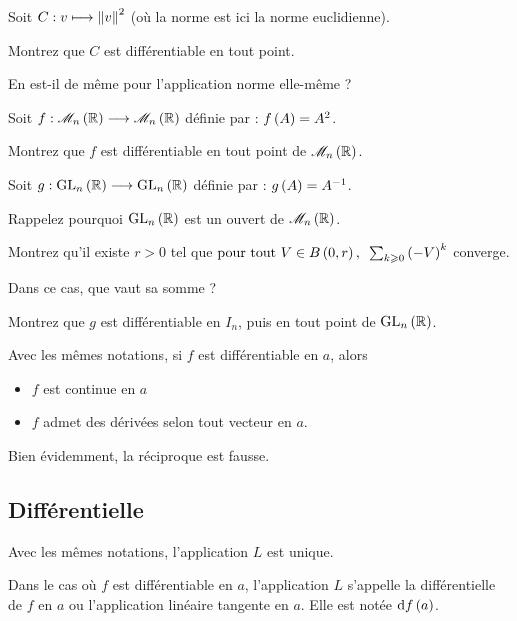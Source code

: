 \begin{exo}
Soit \(C:v\mapsto\norme{v}^2\) (où la norme est ici la norme euclidienne).

Montrez que \(C\) est différentiable en tout point.

En est-il de même pour l'application norme elle-même ?
\end{exo}

\begin{exo}
Soit \(f:\M{n}[\R]\to\M{n}[\R]\) définie par : \(f\left(A\right)=A^2\).

Montrez que \(f\) est différentiable en tout point de \(\M{n}[\R]\).
\end{exo}

\begin{exo}
Soit \(g:\GL{n}[\R]\to\GL{n}[\R]\) définie par : \(g\left(A\right)=A^{-1}\).

Rappelez pourquoi \(\GL{n}[\R]\) est un ouvert de \(\M{n}[\R]\).

Montrez qu'il existe \(r>0\) tel que \(\quantifs{\tpt V\in\bouleo{0}{r}}\sum_{k\geq0}\paren{-V}^k\) converge.

Dans ce cas, que vaut sa somme ?

Montrez que \(g\) est différentiable en \(I_n\), puis en tout point de \(\GL{n}[\R]\).
\end{exo}

\begin{prop}
Avec les mêmes notations, si \(f\) est différentiable en \(a\), alors

\begin{itemize}
    \item \(f\) est continue en \(a\) \\
    \item \(f\) admet des dérivées selon tout vecteur en \(a\).
\end{itemize}
\end{prop}

Bien évidemment, la réciproque est fausse.

\subsection{Différentielle}

\begin{prop}
Avec les mêmes notations, l'application \(L\) est unique.
\end{prop}

Dans le cas où \(f\) est différentiable en \(a\), l'application \(L\) s'appelle la différentielle de \(f\) en \(a\) ou l'application linéaire tangente en \(a\). Elle est notée \(\odif{f}\paren{a}\).

